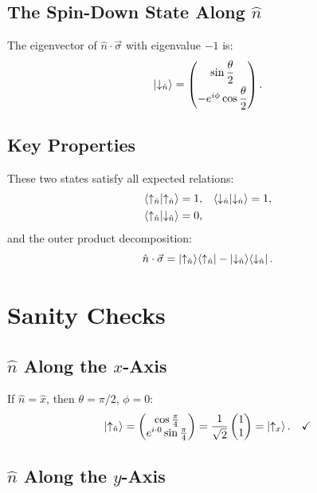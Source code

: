 \documentclass[11pt,a4paper]{article}
\theoremstyle{definition}
\theoremstyle{plain}
\theoremstyle{remark}
\begin{document}
\subsection{The Spin-Down State Along $\hat{n}$}

The eigenvector of $\hat{n}\cdot\vec{\sigma}$ with eigenvalue $-1$ is:
\[
    \ket{\downarrow_{\hat{n}}} = \begin{pmatrix} \sin\dfrac{\theta}{2} \\[6pt] -e^{i\phi}\cos\dfrac{\theta}{2} \end{pmatrix}.
\]

\subsection{Key Properties}

These two states satisfy all expected relations:
\begin{align}
    \braket{\uparrow_{\hat{n}}}{\uparrow_{\hat{n}}} &= 1, & \braket{\downarrow_{\hat{n}}}{\downarrow_{\hat{n}}} &= 1, \\
    \braket{\uparrow_{\hat{n}}}{\downarrow_{\hat{n}}} &= 0, &&
\end{align}
and the outer product decomposition:
\[
    \hat{n}\cdot\vec{\sigma} = \ket{\uparrow_{\hat{n}}}\!\bra{\uparrow_{\hat{n}}} - \ket{\downarrow_{\hat{n}}}\!\bra{\downarrow_{\hat{n}}}.
\]

\section{Sanity Checks}

\subsection{$\hat{n}$ Along the $x$-Axis}

If $\hat{n} = \hat{x}$, then $\theta = \pi/2$, $\phi = 0$:
\[
    \ket{\uparrow_{\hat{n}}} = \begin{pmatrix}\cos\frac{\pi}{4} \\ e^{i\cdot 0}\sin\frac{\pi}{4}\end{pmatrix} = \frac{1}{\sqrt{2}}\begin{pmatrix}1\\1\end{pmatrix} = \ket{\uparrow_x}. \quad\checkmark
\]

\subsection{$\hat{n}$ Along the $y$-Axis}
\end{document}
